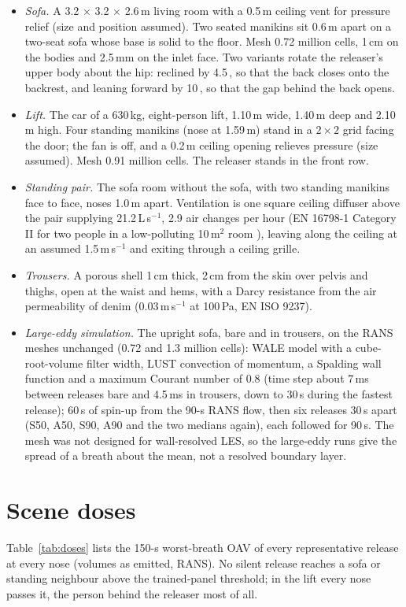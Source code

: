 \documentclass[11pt]{article}
\begin{document}
\begin{itemize}
  \item \emph{Sofa.} A 3.2 $\times$ 3.2 $\times$ 2.6\,m living room with a 0.5\,m ceiling vent for pressure relief
  (size and position assumed). Two seated manikins sit 0.6\,m apart on a two-seat sofa whose base is solid to the
  floor. Mesh 0.72 million cells, 1\,cm on the bodies and 2.5\,mm on the inlet face. Two variants rotate the
  releaser's upper body about the hip: reclined by 4.5\,\textdegree, so that the back closes onto the backrest, and
  leaning forward by 10\,\textdegree, so that the gap behind the back opens.
  \item \emph{Lift.} The car of a 630\,kg, eight-person lift, 1.10\,m wide, 1.40\,m deep and 2.10\,m high.
  Four standing manikins (nose at 1.59\,m) stand in a $2 \times 2$ grid facing the door; the fan is off, and a 0.2\,m
  ceiling opening relieves pressure (size assumed). Mesh 0.91 million cells. The releaser stands in the front row.
  \item \emph{Standing pair.} The sofa room without the sofa, with two standing manikins face to face, noses 1.0\,m
  apart. Ventilation is one square ceiling diffuser above the pair supplying 21.2\,L\,s$^{-1}$, 2.9 air changes per
  hour (EN 16798-1 Category II for two people in a low-polluting 10\,m$^2$ room \cite{olesen2024}), leaving along the
  ceiling at an assumed 1.5\,m\,s$^{-1}$ and exiting through a ceiling grille.
  \item \emph{Trousers.} A porous shell 1\,cm thick, 2\,cm from the skin over pelvis and thighs, open at the waist and
  hems, with a Darcy resistance from the air permeability of denim (0.03\,m\,s$^{-1}$ at 100\,Pa, EN ISO 9237).
  \item \emph{Large-eddy simulation.} The upright sofa, bare and in trousers, on the RANS meshes unchanged (0.72 and
  1.3 million cells): WALE model with a cube-root-volume filter width, LUST convection of momentum, a Spalding wall
  function and a maximum Courant number of 0.8 (time step about 7\,ms between releases bare and 4.5\,ms in
  trousers, down to 30\,\textmu s during the fastest release); 60\,s of spin-up from the 90-s RANS flow, then six
  releases 30\,s apart (S50, A50, S90, A90 and the two medians again), each followed for 90\,s. The mesh was not
  designed for wall-resolved LES, so the large-eddy runs give the spread of a breath about the mean, not a resolved
  boundary layer.
\end{itemize}

\section{Scene doses}
\label{sec:si-sofa}
\label{sec:si-elevator}
\label{sec:si-standing}
Table~\ref{tab:doses} lists the 150-s worst-breath OAV of every representative release at every nose (volumes as
emitted, RANS). No silent release reaches a sofa or standing neighbour above the trained-panel threshold; in the
lift every nose passes it, the person behind the releaser most of all.
\end{document}
